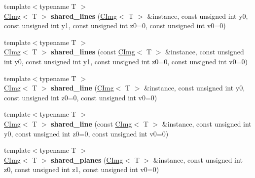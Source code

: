 \begin{DoxyCompactItemize}
\item 
\hypertarget{namespacecimg__library_abe1465e8daa8bde57608c057bd030375}{{\footnotesize template$<$typename T $>$ }\\\hyperlink{structcimg__library_1_1_c_img}{C\-Img}$<$ T $>$ {\bfseries shared\-\_\-lines} (\hyperlink{structcimg__library_1_1_c_img}{C\-Img}$<$ T $>$ \&instance, const unsigned int y0, const unsigned int y1, const unsigned int z0=0, const unsigned int v0=0)}\label{namespacecimg__library_abe1465e8daa8bde57608c057bd030375}

\item 
\hypertarget{namespacecimg__library_a1ad772ffc20e166a6b5fd2569f61c941}{{\footnotesize template$<$typename T $>$ }\\\hyperlink{structcimg__library_1_1_c_img}{C\-Img}$<$ T $>$ {\bfseries shared\-\_\-lines} (const \hyperlink{structcimg__library_1_1_c_img}{C\-Img}$<$ T $>$ \&instance, const unsigned int y0, const unsigned int y1, const unsigned int z0=0, const unsigned int v0=0)}\label{namespacecimg__library_a1ad772ffc20e166a6b5fd2569f61c941}

\item 
\hypertarget{namespacecimg__library_a822aa4f2a360f521f98ca184633db25d}{{\footnotesize template$<$typename T $>$ }\\\hyperlink{structcimg__library_1_1_c_img}{C\-Img}$<$ T $>$ {\bfseries shared\-\_\-line} (\hyperlink{structcimg__library_1_1_c_img}{C\-Img}$<$ T $>$ \&instance, const unsigned int y0, const unsigned int z0=0, const unsigned int v0=0)}\label{namespacecimg__library_a822aa4f2a360f521f98ca184633db25d}

\item 
\hypertarget{namespacecimg__library_aa4694300282f773c49746b22143a66b6}{{\footnotesize template$<$typename T $>$ }\\\hyperlink{structcimg__library_1_1_c_img}{C\-Img}$<$ T $>$ {\bfseries shared\-\_\-line} (const \hyperlink{structcimg__library_1_1_c_img}{C\-Img}$<$ T $>$ \&instance, const unsigned int y0, const unsigned int z0=0, const unsigned int v0=0)}\label{namespacecimg__library_aa4694300282f773c49746b22143a66b6}

\item 
\hypertarget{namespacecimg__library_a73744c268e30ed33e23a41ba97fcfb2a}{{\footnotesize template$<$typename T $>$ }\\\hyperlink{structcimg__library_1_1_c_img}{C\-Img}$<$ T $>$ {\bfseries shared\-\_\-planes} (\hyperlink{structcimg__library_1_1_c_img}{C\-Img}$<$ T $>$ \&instance, const unsigned int z0, const unsigned int z1, const unsigned int v0=0)}\label{namespacecimg__library_a73744c268e30ed33e23a41ba97fcfb2a}


\end{DoxyCompactItemize}
